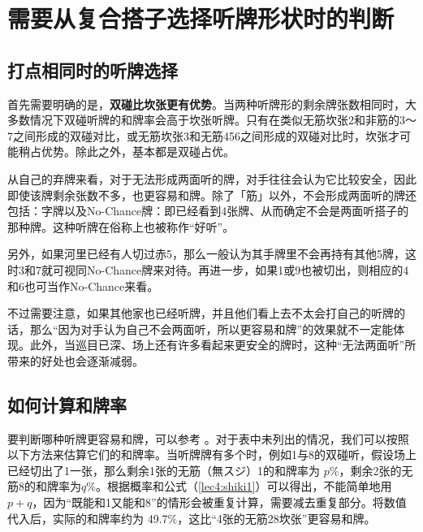 \chapter[听牌的选择]{需要从复合搭子选择听牌形状时的判断}

\section{打点相同时的听牌选择}

首先需要明确的是，\textbf{双碰比坎张更有优势}。当两种听牌形的剩余牌张数相同时，大多数情况下双碰听牌的和牌率会高于坎张听牌。只有在类似无筋坎张2和非筋的3～7之间形成的双碰对比，或无筋坎张3和无筋456之间形成的双碰对比时，坎张才可能稍占优势。除此之外，基本都是双碰占优。

从自己的弃牌来看，对于无法形成两面听的牌，对手往往会认为它比较安全，因此即使该牌剩余张数不多，也更容易和牌。除了「筋」以外，不会形成两面听的牌还包括：字牌以及No-Chance牌：即已经看到4张牌、从而确定不会是两面听搭子的那种牌。这种听牌在俗称上也被称作“好听”。

另外，如果河里已经有人切过赤5，那么一般认为其手牌里不会再持有其他5牌，这时3和7就可视同No-Chance牌来对待。再进一步，如果1或9也被切出，则相应的4和6也可当作No-Chance来看。

不过需要注意，如果其他家也已经听牌，并且他们看上去不太会打自己的听牌的话，那么“因为对手认为自己不会两面听，所以更容易和牌”的效果就不一定能体现。此外，当巡目已深、场上还有许多看起来更安全的牌时，这种“无法两面听”所带来的好处也会逐渐减弱。

\section{如何计算和牌率}
要判断哪种听牌更容易和牌，可以参考
。对于表中未列出的情况，我们可以按照以下方法来估算它们的和牌率。当听牌牌有多个时，例如1与8的双碰听，假设场上已经切出了1一张，那么剩余1张的无筋（無スジ）1的和牌率为 $p$\%，剩余2张的无筋8的和牌率为$q$\%。根据概率和公式（\ref{lec4:shiki1}）可以得出，不能简单地用 $p + q$，因为“既能和1又能和8”的情形会被重复计算，需要减去重复部分。将数值代入后，实际的和牌率约为 49.7\%，这比“4张的无筋28坎张”更容易和牌。

